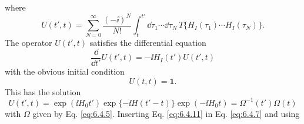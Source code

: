 where
\begin{equation}
U(t',t)=\sum_{N=0}^{\infty}\frac{(-\ii)^N}{N!}
\int_t^{t'}\dd\tau_1\cdots \dd\tau_N\,
T\{H_I(\tau_1)\cdots H_I(\tau_N)\}.
\tag{6.4.8}
\label{eq:6.4.8}
\end{equation}
The operator $U(t',t)$ satisfies the differential equation
\begin{equation}
\frac{\dd}{\dd t'}U(t',t)=-\ii H_I(t')U(t',t)
\tag{6.4.9}
\label{eq:6.4.9}
\end{equation}
with the obvious initial condition
\begin{equation}
U(t,t)=\mathbf{1}.
\tag{6.4.10}
\label{eq:6.4.10}
\end{equation}
This has the solution
\begin{equation}
U(t',t)=\exp(\ii H_0t')\exp\{-\ii H(t'-t)\}\exp(-\ii H_0t)
=\Omega^{-1}(t')\Omega(t)
\tag{6.4.11}
\label{eq:6.4.11}
\end{equation}
with $\Omega$ given by Eq. \eqref{eq:6.4.5}. Inserting Eq. \eqref{eq:6.4.11} in Eq. \eqref{eq:6.4.7} and
using\space%
